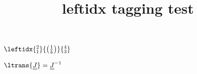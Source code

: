 \documentclass{article}
\title{leftidx tagging test}
\begin{document}
$\leftidx{_1^2}{\left(\frac{1}{b}\right)}{_3^4}$

$\ltrans{\underline{\underline{J}}}=
\underline{\underline{J}}^{-1}$
\end{document}
